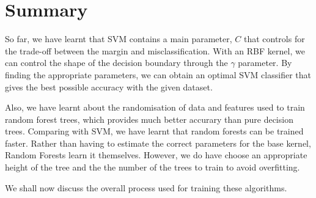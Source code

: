 \section{Summary}
So far, we have learnt that SVM contains a main parameter, $C$ that controls for the trade-off between the margin and misclassification. With an RBF kernel, we can control the shape of the decision boundary through the $\gamma$ parameter. By finding the appropriate parameters, we can obtain an optimal SVM classifier that gives the best possible accuracy with the given dataset.

Also, we have learnt about the randomisation of data and features used to train random forest trees, which provides much better accurary than pure decision trees. Comparing with SVM, we have learnt that random forests can be trained faster. Rather than having to estimate the correct parameters for the base kernel, Random Forests learn it themselves. However, we do have choose an appropriate height of the tree and the the number of the trees to train to avoid overfitting.

We shall now discuss the overall process used for training these algorithms.

